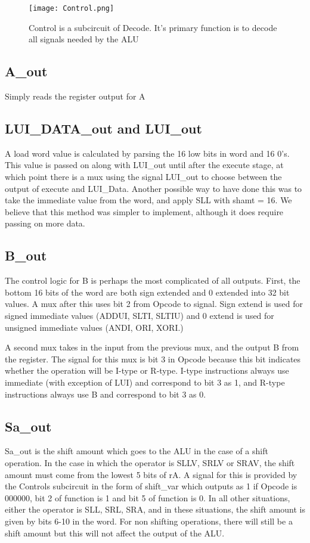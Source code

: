 \documentclass[10pt]{article}
\begin{document}
\begin{figure}[h]
    \texttt{[image: Control.png]}
    \caption{Control is a subcircuit of Decode. It's primary function is to decode all signals needed by the ALU}
\end{figure}

\subsection{A\_out}
Simply reads the register output for A

\subsection{LUI\_DATA\_out and LUI\_out}
A load word value is calculated by parsing the 16 low bits in word and 16 0's. This value is passed on along with LUI\_out until after the execute stage, at which point there is a mux using the signal LUI\_out to choose between the output of execute and LUI\_Data. Another possible way to have done this was to take the immediate value from the word, and apply SLL with shamt = 16. We believe that this method was simpler to implement, although it does require passing on more data.

\subsection{B\_out}
The control logic for B is perhaps the most complicated of all outputs. First, the bottom 16 bits of the word are both sign extended and 0 extended into 32 bit values. A mux after this uses bit 2 from Opcode to signal. Sign extend is used for signed immediate values (ADDUI, SLTI, SLTIU) and 0 extend is used for unsigned immediate values (ANDI, ORI, XORI.) 

A second mux takes in the input from the previous mux, and the output B from the register. The signal for this mux is bit 3 in Opcode because this bit indicates whether the operation will be I-type or R-type. I-type instructions always use immediate (with exception of LUI) and correspond to bit 3 as 1, and R-type instructions always use B and correspond to bit 3 as 0. 

\subsection{Sa\_out}
Sa\_out is the shift amount which goes to the ALU in the case of a shift operation. In the case in which the operator is SLLV, SRLV or SRAV, the shift amount must come from the lowest 5 bits of rA. A signal for this is provided by the Controls subcircuit in the form of shift\_var which outputs as 1 if Opcode is 000000, bit 2 of function is 1 and bit 5 of function is 0. In all other situations, either the operator is SLL, SRL, SRA, and in these situations, the shift amount is given by bits 6-10 in the word. For non shifting operations, there will still be a shift amount but this will not affect the output of the ALU.
\end{document}
